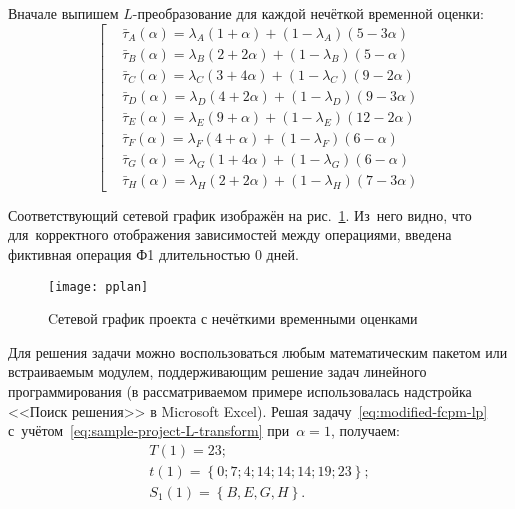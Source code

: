 Вначале выпишем $L$-преобразование для каждой нечёткой временной оценки:
\begin{equation}
\label{eq:sample-project-L-transform}
\left[ \begin{aligned}
   & \bar{\tau}_A\left( \alpha \right)=\lambda_A\left( 1+\alpha \right)+\left( 1-\lambda_A \right)\left( 5-3\alpha \right) \\ 
   & \bar{\tau}_B\left( \alpha \right)=\lambda_B\left( 2+2\alpha \right)+\left( 1-\lambda_B \right)\left( 5-\alpha \right) \\ 
   & \bar{\tau}_C\left( \alpha \right)=\lambda_C\left( 3+4\alpha \right)+\left( 1-\lambda_C \right)\left( 9-2\alpha \right) \\ 
   & \bar{\tau}_D\left( \alpha \right)=\lambda_D\left( 4+2\alpha \right)+\left( 1-\lambda_D \right)\left( 9-3\alpha \right) \\ 
   & \bar{\tau}_E\left( \alpha \right)=\lambda_E\left( 9+\alpha \right)+\left( 1-\lambda_E \right)\left( 12-2\alpha \right) \\ 
   & \bar{\tau}_F\left( \alpha \right)=\lambda_F\left( 4+\alpha \right)+\left( 1-\lambda_F \right)\left( 6-\alpha \right) \\ 
   & \bar{\tau}_G\left( \alpha \right)=\lambda_G\left( 1+4\alpha \right)+\left( 1-\lambda_G \right)\left( 6-\alpha \right) \\ 
   & \bar{\tau}_H\left( \alpha \right)=\lambda_H\left( 2+2\alpha \right)+\left( 1-\lambda_H \right)\left( 7-3\alpha \right)
\end{aligned} \right.
\end{equation}

Соответствующий сетевой график изображён на рис.~\ref{fig:pplan}. Из~него видно, что для~корректного отображения зависимостей между операциями, введена фиктивная операция Ф1 длительностью 0 дней.
\begin{figure}[h!]
  \centering
  {
    \texttt{[image: pplan]}
    \caption{Cетевой график проекта с нечёткими временными оценками}
    \label{fig:pplan}
  }
\end{figure}

Для решения задачи можно воспользоваться любым математическим пакетом или встраиваемым модулем, поддерживающим решение задач линейного программирования (в рассматриваемом примере использовалась надстройка <<Поиск решения>> в Microsoft Excel). Решая задачу~\eqref{eq:modified-fcpm-lp} с~учётом~\eqref{eq:sample-project-L-transform} при~$\alpha=1$, получаем:
\begin{gather*}
  T\left( 1 \right)=23; \\ 
  t\left( 1 \right)=\left\{ 0;7;4;14;14;14;19;23 \right\}; \\ 
  S_1\left( 1 \right)=\left\{ B,E,G,H \right\}.
\end{gather*}

